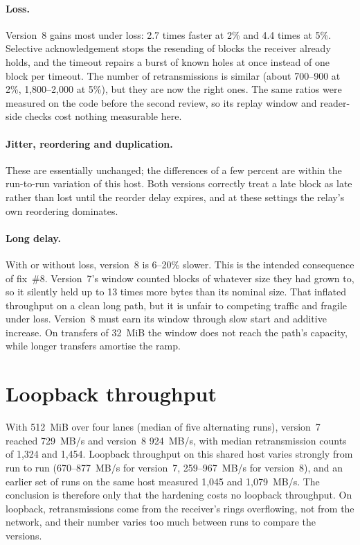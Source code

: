 \paragraph{Loss.} Version~8 gains most under loss: 2.7 times faster at 2\% and 4.4 times at 5\%. Selective
acknowledgement stops the resending of blocks the receiver already holds, and the timeout repairs a burst of
known holes at once instead of one block per timeout. The number of retransmissions is similar (about 700--900
at 2\%, 1,800--2,000 at 5\%), but they are now the right ones. The same ratios were measured on the code before
the second review, so its replay window and reader-side checks cost nothing measurable here.

\paragraph{Jitter, reordering and duplication.} These are essentially unchanged; the differences of a few percent
are within the run-to-run variation of this host. Both versions correctly treat a late block
as late rather than lost until the reorder delay expires, and at these settings the relay's own reordering
dominates.

\paragraph{Long delay.} With or without loss, version~8 is 6--20\% slower. This is the intended consequence of
fix~\#8. Version~7's window counted blocks of whatever size they had grown to, so it silently held up to 13
times more bytes than its nominal size. That inflated throughput on a clean long path, but it is unfair to
competing traffic and fragile under loss. Version~8 must earn its window through slow start and additive
increase. On transfers of 32~MiB the window does not reach the path's capacity, while longer transfers amortise
the ramp.

\section{Loopback throughput}

With 512~MiB over four lanes (median of five alternating runs), version~7 reached 729~MB/s and version~8
924~MB/s, with median retransmission counts of 1,324 and 1,454. Loopback throughput on this shared host varies
strongly from run to run (670--877~MB/s for version~7, 259--967~MB/s for version~8), and an earlier set of runs
on the same host measured 1,045 and 1,079~MB/s. The conclusion is therefore only that the hardening costs no
loopback throughput. On loopback, retransmissions come from the receiver's rings overflowing, not from the
network, and their number varies too much between runs to compare the versions.

